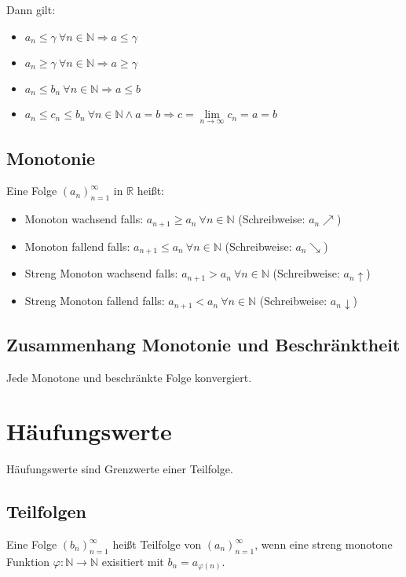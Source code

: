 \documentclass[10pt]{article}
\newcommand{\R}{\mathbb{R}}
\newcommand{\an}{{(a_n)}_{n=1}^\infty}
\begin{document}
    Dann gilt:

    \begin{itemize}
        \item $a_n \leq \gamma\ \forall n \in \mathbb{N} \Rightarrow a \leq \gamma$
        \item $a_n \geq \gamma\ \forall n \in \mathbb{N} \Rightarrow a \geq \gamma$
        \item $a_n \leq b_n\ \forall n \in \mathbb{N} \Rightarrow a \leq b$
        \item $a_n \leq c_n \leq b_n\ \forall n \in \mathbb{N} \wedge a=b
        \Rightarrow c=\lim\limits_{n \rightarrow \infty} c_n = a = b$
    \end{itemize}

    \subsection{Monotonie}
    Eine Folge $\an$ in $\R$ heißt:
    \begin{itemize}
        \item Monoton wachsend falls: $a_{n+1} \geq {a_n}\ \forall n \in \mathbb{N}$ (Schreibweise: $a_n \nearrow$)
        \item Monoton fallend falls: $a_{n+1} \leq {a_n}\ \forall n \in \mathbb{N}$ (Schreibweise: $a_n \searrow$)
        \item Streng Monoton wachsend falls: $a_{n+1} > {a_n}\ \forall n \in \mathbb{N}$ (Schreibweise: $a_n \uparrow$)
        \item Streng Monoton fallend falls: $a_{n+1} < {a_n}\ \forall n \in \mathbb{N}$ (Schreibweise: $a_n \downarrow$)
    \end{itemize}

    \subsection{Zusammenhang Monotonie und Beschränktheit}
    Jede Monotone und beschränkte Folge konvergiert.

    \section{Häufungswerte}
    Häufungswerte sind Grenzwerte einer Teilfolge.

    \subsection{Teilfolgen}
    Eine Folge ${(b_n)}_{n=1}^\infty$ heißt Teilfolge von $\an$, wenn
    eine streng monotone Funktion $\varphi: \mathbb{N} \rightarrow \mathbb{N}$ exisitiert
    mit $b_n = a_{\varphi(n)}$.
\end{document}
